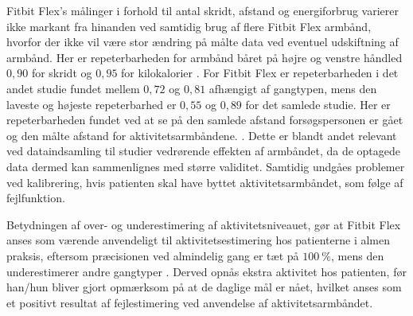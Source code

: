 Fitbit Flex's målinger i forhold til antal skridt, afstand og energiforbrug varierer ikke markant fra hinanden ved samtidig brug af flere Fitbit Flex armbånd, hvorfor der ikke vil være stor ændring på målte data ved eventuel udskiftning af armbånd. Her er repeterbarheden for armbånd båret på højre og venstre håndled $0,90$ for skridt og $0,95$ for kilokalorier \citep{evenson2015}. For Fitbit Flex er repeterbarheden i det andet studie fundet mellem $0,72$ og $0,81$ afhængigt af gangtypen, mens den laveste og højeste repeterbarhed er $0,55$ og $0,89$ for det samlede studie. Her er repeterbarheden fundet ved at se på den samlede afstand forsøgspersonen er gået og den målte afstand for aktivitetsarmbåndene. \citep{kaewkannate2016}. Dette er blandt andet relevant ved dataindsamling til studier vedrørende effekten af armbåndet, da de optagede data dermed kan sammenlignes med større validitet. Samtidig undgåes problemer ved kalibrering, hvis patienten skal have byttet aktivitetsarmbåndet, som følge af fejlfunktion.

Betydningen af over- og underestimering af aktivitetsniveauet, gør at Fitbit Flex anses som værende anvendeligt til aktivitetsestimering hos patienterne i almen praksis, eftersom præcisionen ved almindelig gang er tæt på $100~\%$, mens den underestimerer andre gangtyper \citep{kaewkannate2016}. Derved opnås ekstra aktivitet hos patienten, før han/hun bliver gjort opmærksom på at de daglige mål er nået, hvilket anses som et positivt resultat af fejlestimering ved anvendelse af aktivitetsarmbåndet.